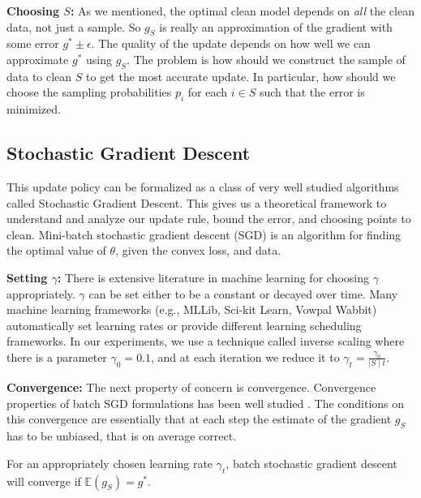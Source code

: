 \vspace{0.5em}

\noindent\textbf{Choosing $S$: } As we mentioned, the optimal clean model depends on \emph{all} the clean data, not just a sample. 
So $g_S$ is really an approximation of the gradient with some error $g^* \pm \epsilon$. 
The quality of the update depends on how well we can approximate $g^*$ using $g_S$.
The problem is how should we construct the sample of data to clean $S$ to get the most accurate update.
In particular, how should we choose the sampling probabilities $p_i$ for each $i \in S$ such that the error is minimized.

\subsection{Stochastic Gradient Descent}\label{sgd}
This update policy can be formalized as a class of very well studied algorithms called Stochastic Gradient Descent.
This gives us a theoretical framework to understand and analyze our update rule, bound the error, and choosing points to clean.
Mini-batch stochastic gradient descent (SGD) is an algorithm for finding the optimal value
of $\theta$, given the convex loss, and data.

\vspace{0.5em}

\noindent\textbf{ Setting $\gamma$: } There is extensive literature in machine learning for choosing $\gamma$ appropriately. $\gamma$ can be set either to be a constant or decayed over time. Many machine learning frameworks (e.g., MLLib, Sci-kit Learn, Vowpal Wabbit) automatically set learning rates or provide different learning scheduling frameworks. 
In our experiments, we use a technique called inverse scaling where there is a parameter $\gamma_0=0.1$, and at each iteration we reduce it to $\gamma_t = \frac{\gamma_0}{\mid S \mid t}$. 

\vspace{0.5em}

\noindent\textbf{ Convergence: } The next property of concern is convergence. Convergence properties of batch SGD formulations has been well studied \cite{dekel2012optimal}. 
The conditions on this convergence are essentially that at each step the estimate of the gradient $g_S$ has to be unbiased, that is on average correct. 

\begin{proposition}
For an appropriately chosen learning rate $\gamma_t$, batch stochastic gradient descent will converge if $\mathbb{E}(g_S)=g^*$.
\label{unbiased}
\end{proposition}

